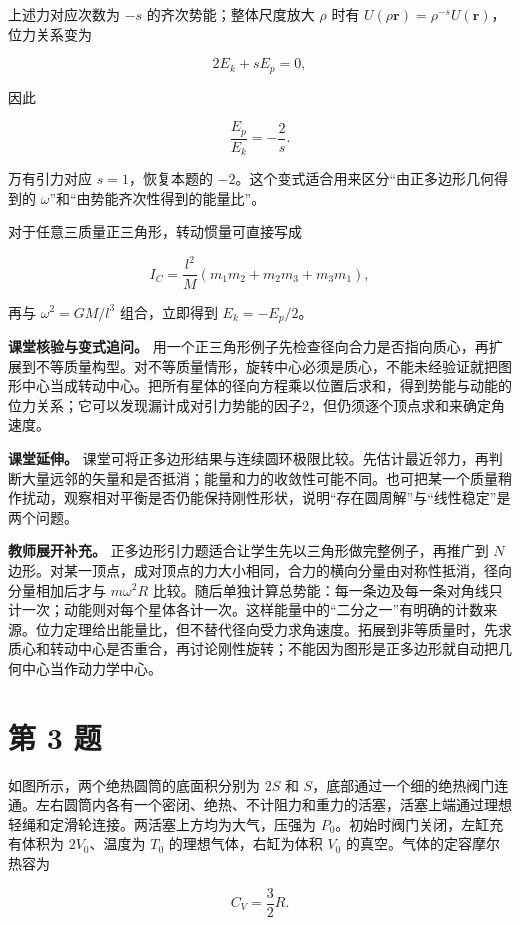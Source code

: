 \documentclass[12pt,a4paper,UTF8]{ctexart}
\begin{document}
上述力对应次数为 \(-s\) 的齐次势能；整体尺度放大 \(\rho\) 时有
\(U(\rho\bm r)=\rho^{-s}U(\bm r)\)，位力关系变为

\[
2E_k+sE_p=0,
\]

因此

\[
\frac{E_p}{E_k}=-\frac2s.
\]

万有引力对应 \(s=1\)，恢复本题的
\(-2\)。这个变式适合用来区分``由正多边形几何得到的
\(\omega\)''和``由势能齐次性得到的能量比''。

对于任意三质量正三角形，转动惯量可直接写成

\[
I_C=\frac{l^2}{M}(m_1m_2+m_2m_3+m_3m_1),
\]

再与 \(\omega^2=GM/l^3\) 组合，立即得到 \(E_k=-E_p/2\)。

\textbf{课堂核验与变式追问。}
用一个正三角形例子先检查径向合力是否指向质心，再扩展到不等质量构型。对不等质量情形，旋转中心必须是质心，不能未经验证就把图形中心当成转动中心。把所有星体的径向方程乘以位置后求和，得到势能与动能的位力关系；它可以发现漏计成对引力势能的因子2，但仍须逐个顶点求和来确定角速度。

\textbf{课堂延伸。}
课堂可将正多边形结果与连续圆环极限比较。先估计最近邻力，再判断大量远邻的矢量和是否抵消；能量和力的收敛性可能不同。也可把某一个质量稍作扰动，观察相对平衡是否仍能保持刚性形状，说明``存在圆周解''与``线性稳定''是两个问题。

\textbf{教师展开补充。}
正多边形引力题适合让学生先以三角形做完整例子，再推广到 \(N\)
边形。对某一顶点，成对顶点的力大小相同，合力的横向分量由对称性抵消，径向分量相加后才与
\(m\omega^2R\)
比较。随后单独计算总势能：每一条边及每一条对角线只计一次；动能则对每个星体各计一次。这样能量中的``二分之一''有明确的计数来源。位力定理给出能量比，但不替代径向受力求角速度。拓展到非等质量时，先求质心和转动中心是否重合，再讨论刚性旋转；不能因为图形是正多边形就自动把几何中心当作动力学中心。

\newpage

\section{第 3 题}\label{ux7b2c-3-ux9898}

如图所示，两个绝热圆筒的底面积分别为 \(2S\) 和
\(S\)，底部通过一个细的绝热阀门连通。左右圆筒内各有一个密闭、绝热、不计阻力和重力的活塞，活塞上端通过理想轻绳和定滑轮连接。两活塞上方均为大气，压强为
\(P_0\)。初始时阀门关闭，左缸充有体积为 \(2V_0\)、温度为 \(T_0\)
的理想气体，右缸为体积 \(V_0\) 的真空。气体的定容摩尔热容为

\[
C_V=\frac32R.
\]
\end{document}
